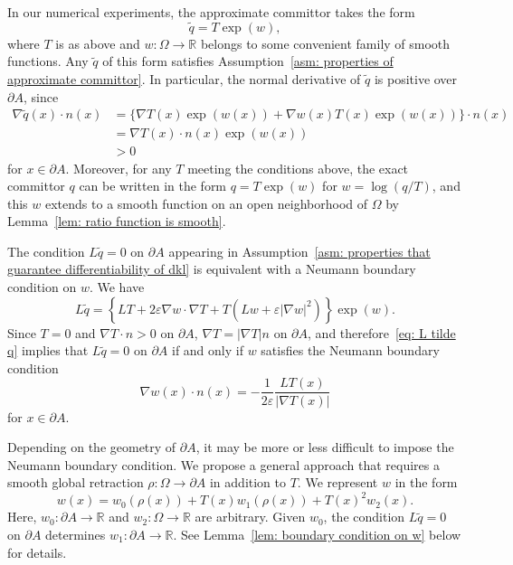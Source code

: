\documentclass[reqno]{amsart}
\newcommand{\Real}{\mathbb{R}}
\newcommand{\eps}{\varepsilon}
\newcommand{\1}{\mathds{1}}
\newcommand{\grad}{\nabla}
\theoremstyle{definition}
\theoremstyle{remark}
\begin{document}
In our numerical experiments, the approximate committor takes the form
\begin{equation*}
  \tilde q = T \exp(w), 
\end{equation*}
where $T$ is as above and $w : \Omega \rightarrow \Real$ belongs to some convenient family of smooth functions. Any $\tilde q$ of this form satisfies Assumption~\ref{asm: properties of approximate committor}. In particular, the normal derivative of $\tilde q$ is positive over $\partial A$, since
\begin{align*}
  \grad \tilde q(x) \cdot n(x) &= \big \{ \grad T(x) \exp(w(x)) + \grad w(x) T(x) \exp(w(x)) \big \} \cdot n(x) \\
                               &= \grad T(x) \cdot n(x) \exp(w(x)) \\
                               &>0
\end{align*}
for $x \in \partial A$. Moreover, for any $T$ meeting the conditions above, the exact committor $q$ can be written in the form $q = T \exp(w)$ for $w = \log \left ( q/ T \right)$, and this $w$ extends to a smooth function on an open neighborhood of $\Omega$ by Lemma~\ref{lem: ratio function is smooth}.


The condition $L \tilde q = 0$ on $\partial A$ appearing in Assumption~\ref{asm: properties that guarantee differentiability of dkl} is equivalent with a Neumann boundary condition on $w$. We have
\begin{equation}\label{eq: L tilde q}
L \tilde q =  \left \{ L T + 2\eps \grad w \cdot \grad T + T \left ( L w + \eps \lvert \grad w \rvert^2 \right ) \right  \} \exp(w). 
\end{equation}
Since $T=0$ and $\grad T \cdot n >0$ on $\partial A$, $\grad T = \lvert \grad T \rvert n$ on $\partial A$, and therefore~\eqref{eq: L tilde q} implies that $L \tilde q =0$ on $\partial A$ if and only if $w$ satisfies the Neumann boundary condition
\begin{equation}
  \grad w (x) \cdot n (x) = -\frac{1}{2 \eps} \frac{L T (x)}{\lvert \grad T (x) \rvert}
\end{equation}
for $x \in \partial A$.

Depending on the geometry of $\partial A$, it may be more or less difficult to impose the Neumann boundary condition. We propose a general approach that requires a smooth global retraction $\rho: \Omega \rightarrow \partial A$ in addition to $T$. We represent $w$ in the form
\begin{equation}\label{eq: representation of w for zero Lq on boundary of A}
  w(x)  = w_0 (\rho(x)) + T(x) w_1(\rho (x)) + T(x)^2 w_2(x). 
\end{equation}
Here, $w_0 : \partial A \rightarrow \Real$ and $w_2: \Omega \rightarrow \Real$ are arbitrary. Given $w_0$, the condition $L \tilde q =0$ on $\partial A$ determines $w_1: \partial A \rightarrow \Real$. See Lemma~\ref{lem: boundary condition on w} below for details.
\end{document}
